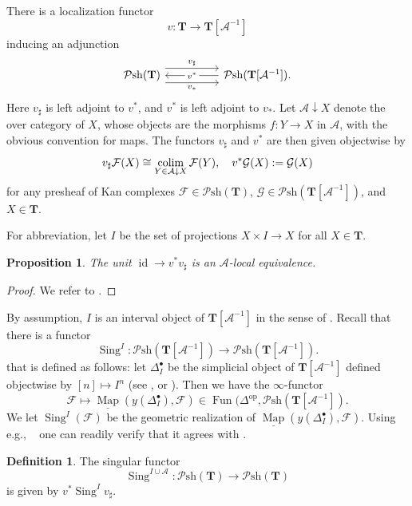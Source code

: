 \documentclass[11pt, a4paper]{amsart}
\newtheorem{prop}[thm]{Proposition}
\theoremstyle{definition}
\newtheorem{df}[thm]{Definition}
\numberwithin{equation}{subsection}
\newcommand{\Sing}{\operatorname{Sing}}              %
\newcommand{\id}{\operatorname{id}}   			%
\newcommand{\colimit}{\mathop{\rm colim}}
\newcommand{\cA}{\mathcal{A}}
\newcommand{\cF}{\mathcal{F}}
\newcommand{\cG}{\mathcal{G}}
\newcommand{\bT}{\mathbf{T}}
\newcommand{\infPsh}{\mathcal{P}\mathrm{sh}}
\newcommand{\Fun}{\operatorname{Fun}}
\newcommand{\Map}{\operatorname{Map}}
\begin{document}
There is a localization functor
\[
v\colon \bT\rightarrow \bT[\cA^{-1}]
\]
inducing an adjunction
\[
\begin{tikzcd}
\infPsh(\bT)\arrow[rr,shift left=1.5ex,"v_\sharp "]\arrow[rr,"v^*" description,leftarrow]\arrow[rr,shift right=1.5ex,"v_*"']&&\infPsh(\bT[\mathcal{A}^{-1}]).
\end{tikzcd}
\] 
Here $v_\sharp$ is left adjoint to $v^*$, 
and $v^*$ is left adjoint to $v_*$.
Let $\cA\downarrow X$ denote the over category of $X$, 
whose objects are the morphisms $f\colon Y\to X$ in $\cA$,  with the obvious convention for maps.
The functors $v_\sharp$ and $v^*$ are then given objectwise by  
\begin{equation}
\label{Singboxx.0.1}
v_\sharp \cF(X)
\cong
\colimit_{Y\in \cA\downarrow X}\cF(Y), \quad v^*\cG(X):=\cG(X)
\end{equation}
for any presheaf of Kan complexes $\cF\in \infPsh(\bT)$, $\cG\in \infPsh(\bT[\cA^{-1}])$, and $X\in \bT$.


For abbreviation, let $I$ be the set of projections $X\times I\to X$ for all $X\in \bT$.


\begin{prop}
\label{Singboxx.5}
The unit $\id \to v^*v_\sharp$ is an $\cA$-local equivalence.
\end{prop}
\begin{proof}
We refer to \cite[Proposition 6.1.11]{logDM}.
\end{proof}

By assumption, $I$ is an interval object of $\bT[\cA^{-1}]$ in the sense of \cite[\S 2.3]{MV}. Recall that there is a functor
\[
\Sing^I\colon \infPsh(\bT[\cA^{-1}])\to \infPsh(\bT[\cA^{-1}]).
\]
that is defined as follows: let $\Delta_I^\bullet$ be the simplicial object of $\bT[\cA^{-1}]$ defined objectwise by $[n]\mapsto I^n$ (see \cite[p.88]{MV}, or \cite[6.2]{logDM}). Then we have the $\infty$-functor
\[\cF \mapsto \underline{\Map}(y(\Delta_I^\bullet), \cF) \in \Fun(\Delta^\mathrm{op}, \infPsh(\bT[\cA^{-1}]). \]
We let $\Sing^I(\cF)$ be the geometric realization of $\underline{\Map}(y(\Delta_I^\bullet), \cF)$. Using e.g., \ \cite[A.2.9.30]{HTT} one can readily verify that it agrees with \cite[Definition 6.2.1]{logDM}.
\begin{df}
\label{Singboxx.1}
The singular functor\index[notation]{SingIA @ $\Sing^{I\cup \cA}$}
\[
\Sing^{I\cup \cA}\colon \infPsh(\bT)\to \infPsh(\bT)
\]
is given by $v^*\Sing^I v_\sharp$.
\end{df}
\end{document}
